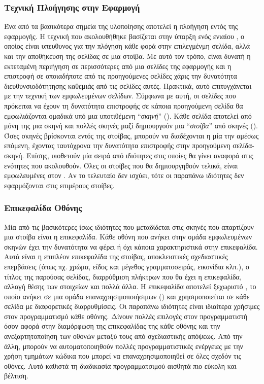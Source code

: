 \subsubsection{Τεχνική Πλοήγησης στην Εφαρμογή}
Ένα από τα βασικότερα σημεία της υλοποίησης αποτελεί η πλοήγηση εντός της εφαρμογής. Η τεχνική που ακολουθήθηκε βασίζεται στην ύπαρξη ενός ενιαίου , ο οποίος είναι υπευθυνος για την πλόγηση κάθε φορά στην επιλεγμένμη σελίδα, αλλά και την αποθήκευση της σελίδας σε μια στοίβα. Με αυτό τον τρόπο, είναι δυνατή η εκτεταμένη περιήγηση σε περισσότερες από μια σελίδες της εφαρμογής και η επιστροφή σε οποιαδήποτε από τις προηγούμενες σελίδες χάρις την δυνατότητα διευθυνσιοδότητησης καθεμιάς από τις σελίδες αυτές.
\newline
\indent
Πρακτικά, αυτό επιτυγχάνεται με την τεχνική των εμφωλευμένων σελίδων. Σύμφωνα με αυτή, οι σελίδες που πρόκειται να έχουν τη δυνατότητα επιστροφής σε κάποια προηγούμενη σελίδα θα εμφωλιάζονται ομαδικά υπό μια υποτιθέμενη ``\textit{σκηνή}'' (). Κάθε σελίδα αποτελεί από μόνη της μια σκηνή και πολλές σκηνές μαζί δημιουργούν μια ``\textit{στοίβα}'' από σκηνές (). Όσες σκηνές βρίσκονται εντός της στοίβας, μπορούν να διαδέχονται η μία την αμέσως επόμενη, έχοντας ταυτόχρονα την δυνατότητα επιστροφής στην προηγούμενη σελίδα-σκηνή. Επίσης, υιοθετούν μία σειρά από ιδιότητες στις οποίες θα γίνει αναφορά στις ενότητες που ακολουθούν.
\newline
\indent
Όλες οι στοίβες που θα δημιουργηθούν τελικά, είναι εμφωλευμένες στον . Αν το τελευταίο δεν ισχύει, τότε οι παραπάνω ιδιότητες δεν εφαρμόζονται στις επιμέρους στοίβες.


\subsubsection{Επικεφαλίδα Οθόνης}
 Μία από τις βασικότερες ίσως ιδιότητες που μεταδίδεται στις σκηνές που απαρτίζουν μια στοίβα είναι η επικεφαλίδα. Κάθε οθόνη που ανήκει στην ομάδα εμφωλευμένων σκηνών έχει την δυνατότητα να φέρει ή όχι κάποια χαρακτηριστικά στην επικεφαλίδα. Αυτά είναι η επιπλέον επικεφαλίδα της στοίβας, αποκλειστικές σχεδιαστικές επεμβάσεις (όπως πχ. χρώμα, είδος και μέγεθος γραμματοσειράς, εικονίδια κλπ.),  ο τίτλος της παρούσας σελίδας, διαρρύθμιση πλήκτρων που θα έχει η επικεφαλίδα, αλλαγή θέσης των στοιχείων και πολλά άλλα. Η επικεφαλίδα αποτελεί ξεχωριστό , το οποίο ανήκει σε μια ομάδα επαναχρησιμοποιήσιμων  () και χρησιμοποιείται σε κάθε σελίδα με διαφορετικές διαρρυθμίσεις.
 \newline
\indent
Οι παραπάνω ιδιότητες είναι ιδιαίτερα χρήσιμες στον προγραμματισμό κάθε οθόνης. Δίνουν πολλές επιλογές στον προγραμματιστή όσον αφορά στην διαμόρφωση της επικεφαλίδας της κάθε οθόνης και την ανεξαρτητοποίηση των οθονών μεταξύ τους από  σχεδιαστικής απόψεως. Από την άλλη, μπορούν να αυτοματοποιηθούν πολλές προγραμματιστικές ενέργειες με την χρήση τμημάτων κώδικα που μπορεί να επαναχρησιμοποιηθεί σε όλες σχεδόν τις οθόνες. Αυτό καθιστά τη διαδικασία προγραμματσιμού αισθητά πιο εύκολη και βέλτιση.

